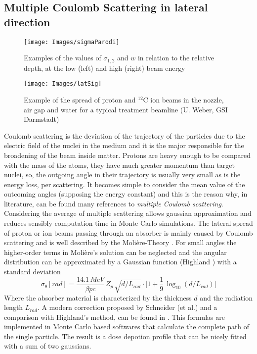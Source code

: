 \documentclass[12pt, a4paper, twoside]{book}
\begin{document}
\subsection{Multiple Coulomb Scattering in lateral direction}
\begin{figure}[!t]
\centering
\texttt{[image: Images/sigmaParodi]}
\caption{Examples of the values of $\sigma_{1,2}$ and $w$ in relation to the relative depth, at the low (left) and high (right) beam energy}
\label{fig:sigPar}
\end{figure}
\begin{figure}[!t]
\texttt{[image: Images/latSig]}
\caption{Example of the spread of proton and $^{12}$C ion beams in the nozzle, air gap and water for a typical treatment beamline (U. Weber, GSI Darmstadt)}
\label{fig:latSig1}
\end{figure}
Coulomb scattering is the deviation of the trajectory of the particles due to the electric field of the nuclei in the medium and it is the major responsible for the broadening of the beam inside matter. Protons are heavy enough to be compared with the mass of the atoms, they have much greater momentum than target nuclei, so, the outgoing angle in their trajectory is usually very small as is the energy loss, per scattering. It becomes simple to consider the mean value of the outcoming angles (supposing the energy constant) and this is the reason why, in literature, can be found many references to \emph{multiple Coulomb scattering}. Considering the average of multiple scattering allows gaussian approximation and reduces sensibly computation time in Monte Carlo simulations.
The lateral spread of proton or ion beams passing through an absorber is mainly caused by Coulomb scattering and is well described by the Molière-Theory \cite{mol:mcs}. For small angles the higher-order terms in Molière's solution can be neglected and the angular distribution can be approximated by a Gaussian function (Highland \cite{high:mcs}) with a standard deviation 
\[
\sigma_\theta [rad]= \frac{14.1\,MeV}{\beta pc}\, Z_p\, \sqrt{d/L_{rad}} \cdot \bigg[ 1 + \frac{1}{9}\,\log_{10} (d/L_{rad} )\bigg]
\]
Where the absorber material is characterized by the thickness $d$ and the radiation length $L_{rad}$. 
A modern correction proposed by Schneider (et al.) and a comparison with Highland's method, can be found in \cite{schn:mcs}. This formulas are implemented in Monte Carlo based softwares that calculate the complete path of the single particle. The result is a dose depotion profile that can be nicely fitted with a sum of two gaussians.
\end{document}
